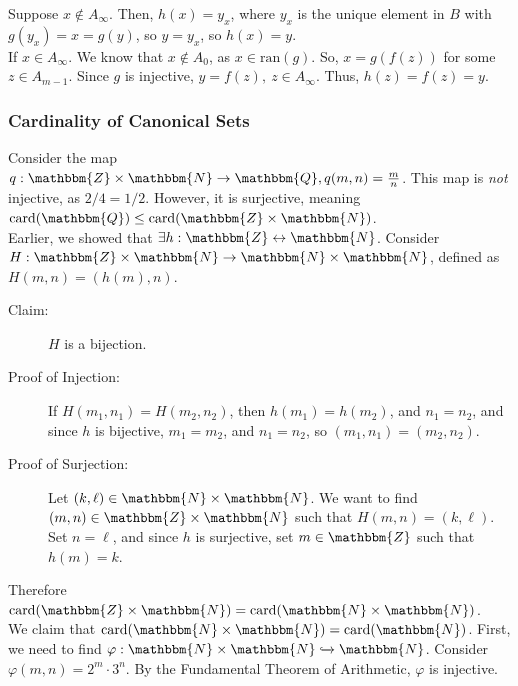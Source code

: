\documentclass[10pt]{extarticle}
\begin{document}
\begin{description}
\begin{description}
              Suppose $x\notin A_{\infty}$. Then, $h(x) = y_x$, where $y_x$ is the unique element in $B$ with $g(y_x)=x=g(y)$, so $y = y_x$, so $h(x) = y$.\\

              If $x\in A_{\infty}$. We know that $x\notin A_0$, as $x\in \text{ran}(g)$. So, $x = g(f(z))$ for some $z\in A_{m-1}$. Since $g$ is injective, $y = f(z),~z\in A_{\infty}$. Thus, $h(z) = f(z) = y$.
          \end{description}
      \end{description}
      \subsubsection{Cardinality of Canonical Sets}%
      Consider the map $q: \mathbbm{Z} \times \mathbbm{N} \rightarrow \mathbbm{Q}, q(m,n) = \frac{m}{n}$. This map is \textsl{not} injective, as $2/4 = 1/2$. However, it is surjective, meaning $\text{card}(\mathbbm{Q}) \leq \text{card}(\mathbbm{Z} \times \mathbbm{N})$.\\

      Earlier, we showed that $\exists h: \mathbbm{Z} \leftrightarrow \mathbbm{N}$. Consider $H: \mathbbm{Z} \times \mathbbm{N} \rightarrow \mathbbm{N} \times\mathbbm{N}$, defined as $H(m,n) = (h(m),n)$. 
      \begin{description}
        \item[Claim:] $H$ is a bijection.
        \item[Proof of Injection:] If $H(m_1,n_1) = H(m_2,n_2)$, then $h(m_1) = h(m_2)$, and $n_1 = n_2$, and since $h$ is bijective, $m_1 = m_2$, and $n_1 = n_2$, so $(m_1,n_1) = (m_2,n_2)$.
        \item[Proof of Surjection:] Let $(k,\ell)\in \mathbbm{N} \times \mathbbm{N}$. We want to find $(m,n)\in \mathbbm{Z}\times \mathbbm{N}$ such that $H(m,n) = (k,\ell)$. Set $n = \ell$, and since $h$ is surjective, set $m\in \mathbbm{Z}$ such that $h(m) = k$.
      \end{description}
      Therefore $\text{card}(\mathbbm{Z} \times \mathbbm{N}) = \text{card}(\mathbbm{N}\times \mathbbm{N})$.\\

      We claim that $\text{card}(\mathbbm{N} \times \mathbbm{N}) = \text{card}(\mathbbm{N})$. First, we need to find $\varphi: \mathbbm{N}\times \mathbbm{N} \xhookrightarrow{} \mathbbm{N}$. Consider $\varphi(m,n) = 2^m\cdot 3^n$. By the Fundamental Theorem of Arithmetic, $\varphi$ is injective.\\
\end{document}
